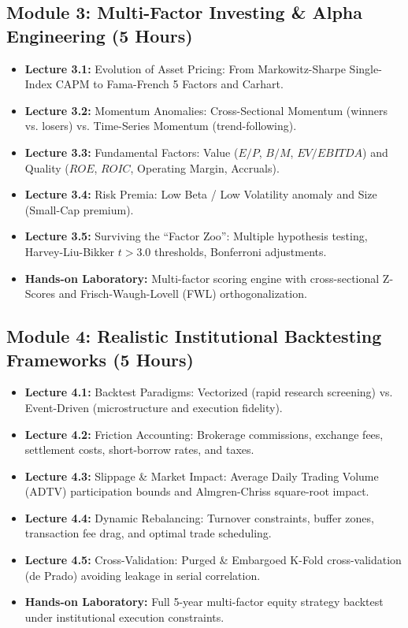 \documentclass[11pt,a4paper]{article}
\begin{document}
\subsection*{Module 3: Multi-Factor Investing \& Alpha Engineering (5 Hours)}
\begin{itemize}[leftmargin=1.5em]
    \item \textbf{Lecture 3.1:} Evolution of Asset Pricing: From Markowitz-Sharpe Single-Index CAPM to Fama-French 5 Factors and Carhart.
    \item \textbf{Lecture 3.2:} Momentum Anomalies: Cross-Sectional Momentum (winners vs. losers) vs. Time-Series Momentum (trend-following).
    \item \textbf{Lecture 3.3:} Fundamental Factors: Value ($E/P$, $B/M$, $EV/EBITDA$) and Quality ($ROE$, $ROIC$, Operating Margin, Accruals).
    \item \textbf{Lecture 3.4:} Risk Premia: Low Beta / Low Volatility anomaly and Size (Small-Cap premium).
    \item \textbf{Lecture 3.5:} Surviving the ``Factor Zoo'': Multiple hypothesis testing, Harvey-Liu-Bikker $t > 3.0$ thresholds, Bonferroni adjustments.
    \item \textbf{Hands-on Laboratory:} Multi-factor scoring engine with cross-sectional Z-Scores and Frisch-Waugh-Lovell (FWL) orthogonalization.
\end{itemize}

\subsection*{Module 4: Realistic Institutional Backtesting Frameworks (5 Hours)}
\begin{itemize}[leftmargin=1.5em]
    \item \textbf{Lecture 4.1:} Backtest Paradigms: Vectorized (rapid research screening) vs. Event-Driven (microstructure and execution fidelity).
    \item \textbf{Lecture 4.2:} Friction Accounting: Brokerage commissions, exchange fees, settlement costs, short-borrow rates, and taxes.
    \item \textbf{Lecture 4.3:} Slippage \& Market Impact: Average Daily Trading Volume (ADTV) participation bounds and Almgren-Chriss square-root impact.
    \item \textbf{Lecture 4.4:} Dynamic Rebalancing: Turnover constraints, buffer zones, transaction fee drag, and optimal trade scheduling.
    \item \textbf{Lecture 4.5:} Cross-Validation: Purged \& Embargoed K-Fold cross-validation (de Prado) avoiding leakage in serial correlation.
    \item \textbf{Hands-on Laboratory:} Full 5-year multi-factor equity strategy backtest under institutional execution constraints.
\end{itemize}
\end{document}
